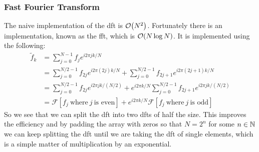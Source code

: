\documentclass[a4paper]{article}
\newcommand{\FT}{\mathcal{F}}
\begin{document}
    \subsubsection{Fast Fourier Transform}
    The naive implementation of the \gls{dft} is \(\order{N^2}\).
    Fortunately there is an implementation, known as the \acrfull{fft}, which is \(\order{N\log N}\).
    It is implemented using the following:
    \begin{align*}
        \tilde{f}_k &= \sum_{j=0}^{N-1} f_je^{i2\pi jk/N}\\
        &= \sum_{j=0}^{N/2-1} f_{2j} e^{i2\pi(2j)k/N} + \sum_{j=0}^{N/2-1} f_{2j+1} e^{i2\pi(2j+1)k/N}\\
        &= \sum_{j=0}^{N/2-1} f_{2j}e^{i2\pi jk/(N/2)} + e^{i2\pi k/N}\sum_{j=0}^{N/2-1} f_{2j+1}e^{i2\pi jk/(N/2)}\\
        &= \FT[f_j~\text{where}~j~\text{is even}] + e^{i2\pi k/N} \FT[f_j~\text{where}~j~\text{is odd}]
    \end{align*}
    So we see that we can split the \gls{dft} into two \glspl{dft} of half the size.
    This improves the efficiency and by padding the array with zeros so that \(N = 2^n\) for some \(n\in\mathbb{N}\) we can keep splitting the \gls{dft} until we are taking the \gls{dft} of single elements, which is a simple matter of multiplication by an exponential.
    
\end{document}

